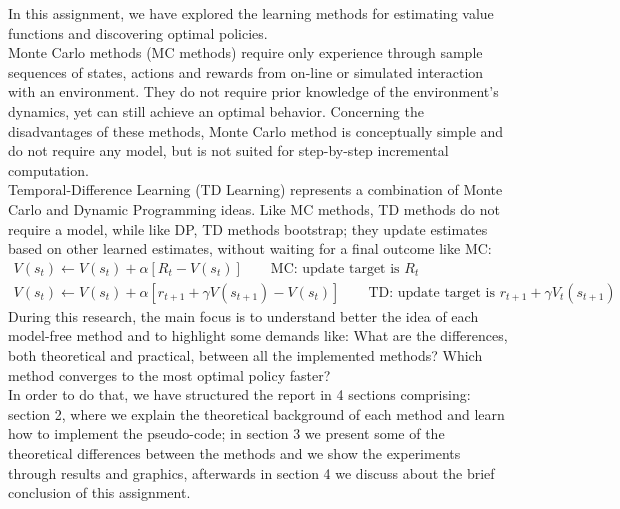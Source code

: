 \documentclass[paper=a4, fontsize=11pt]{scrartcl}
\numberwithin{equation}{section}		%
\numberwithin{figure}{section}			%
\numberwithin{table}{section}				%
\begin{document}
In this assignment, we have explored the learning methods for estimating value functions and discovering  optimal policies.\\ 
Monte Carlo methods (MC methods) require only experience through sample sequences of states, actions and rewards from on-line or simulated interaction with an environment. They do not require prior knowledge of the environment's dynamics, yet can still achieve an optimal behavior. Concerning the disadvantages of these methods, Monte Carlo method is conceptually simple and do not require any model, but is not suited for step-by-step incremental  computation.\\
Temporal-Difference Learning (TD Learning) represents a combination of Monte Carlo and Dynamic Programming ideas. Like MC methods, TD methods do not require a model, while like DP, TD methods bootstrap; they update estimates based on other learned estimates, without waiting for a final outcome like MC:
\begin{align}
V(s_t) \leftarrow V(s_t) + \alpha [R_t-V(s_t)] \qquad \text{MC: update target is $R_t$} \\
V(s_t) \leftarrow V(s_t) + \alpha[r_{t+1}+\gamma V(s_{t+1})-V(s_t)] \qquad \text{TD: update target is $r_{t+1}+\gamma V_t(s_{t+1})$}
\end{align}
During this research, the main focus is to understand better the idea of each model-free method and to highlight some demands like: What are the differences, both theoretical and practical, between all the implemented methods? Which method converges to the most optimal policy faster?\\ 


In order to do that, we have structured the report in 4 sections comprising: section 2, where we explain the theoretical background of each method and learn how to implement the pseudo-code; in section 3 we present  some of the theoretical differences between the methods and we show the experiments through results and graphics, afterwards in section 4 we discuss about the brief conclusion of this assignment.

\end{document}
